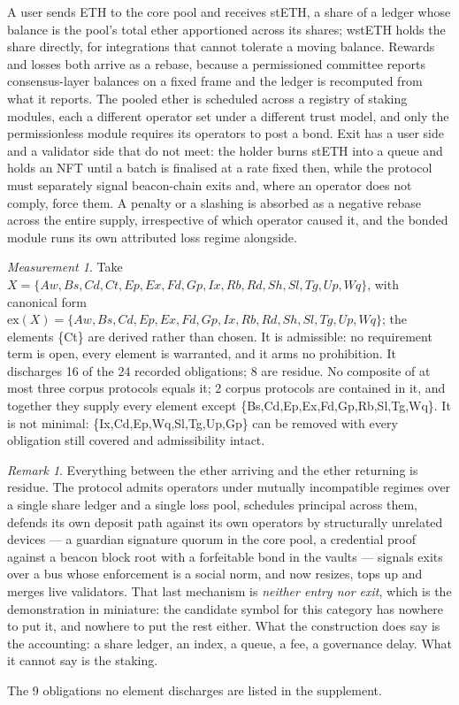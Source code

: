 \documentclass[11pt,reqno]{amsart}
\theoremstyle{plain}
\theoremstyle{definition}
\theoremstyle{remark}
\newtheorem{measurement}[theorem]{Measurement}
\newtheorem{remark}[theorem]{Remark}
\begin{document}
A user sends ETH to the core pool and receives stETH, a share of a ledger whose balance is the pool's total ether apportioned across its shares; wstETH holds the share directly, for integrations that cannot tolerate a moving balance. Rewards and losses both arrive as a rebase, because a permissioned committee reports consensus-layer balances on a fixed frame and the ledger is recomputed from what it reports. The pooled ether is scheduled across a registry of staking modules, each a different operator set under a different trust model, and only the permissionless module requires its operators to post a bond. Exit has a user side and a validator side that do not meet: the holder burns stETH into a queue and holds an NFT until a batch is finalised at a rate fixed then, while the protocol must separately signal beacon-chain exits and, where an operator does not comply, force them. A penalty or a slashing is absorbed as a negative rebase across the entire supply, irrespective of which operator caused it, and the bonded module runs its own attributed loss regime alongside.

\begin{measurement}\label{meas:case:lsd:lido}
Take $X = \{Aw,Bs,Cd,Ct,Ep,Ex,Fd,Gp,Ix,Rb,Rd,Sh,Sl,Tg,Up,Wq\}$, with canonical form
$\mathrm{ex}(X) = \{Aw,Bs,Cd,Ep,Ex,Fd,Gp,Ix,Rb,Rd,Sh,Sl,Tg,Up,Wq\}$; the elements \{Ct\} are derived rather than chosen.
It is admissible: no requirement term is open, every element is warranted, and it arms no prohibition. It discharges 16 of the 24 recorded obligations; 8 are residue. No composite of at most three corpus protocols equals it; 2 corpus protocols are contained in it, and together they supply every element except \{Bs,Cd,Ep,Ex,Fd,Gp,Rb,Sl,Tg,Wq\}.
It is not minimal: \{Ix,Cd,Ep,Wq,Sl,Tg,Up,Gp\} can be removed with every obligation still covered and admissibility intact.
\end{measurement}

\begin{remark}
Everything between the ether arriving and the ether returning is residue. The protocol admits operators under mutually incompatible regimes over a single share ledger and a single loss pool, schedules principal across them, defends its own deposit path against its own operators by structurally unrelated devices --- a guardian signature quorum in the core pool, a credential proof against a beacon block root with a forfeitable bond in the vaults --- signals exits over a bus whose enforcement is a social norm, and now resizes, tops up and merges live validators. That last mechanism is \emph{neither entry nor exit}, which is the demonstration in miniature: the candidate symbol for this category has nowhere to put it, and nowhere to put the rest either. What the construction does say is the accounting: a share ledger, an index, a queue, a fee, a governance delay. What it cannot say is the staking.

The 9 obligations no element discharges are listed in the supplement.
\end{remark}
\end{document}
